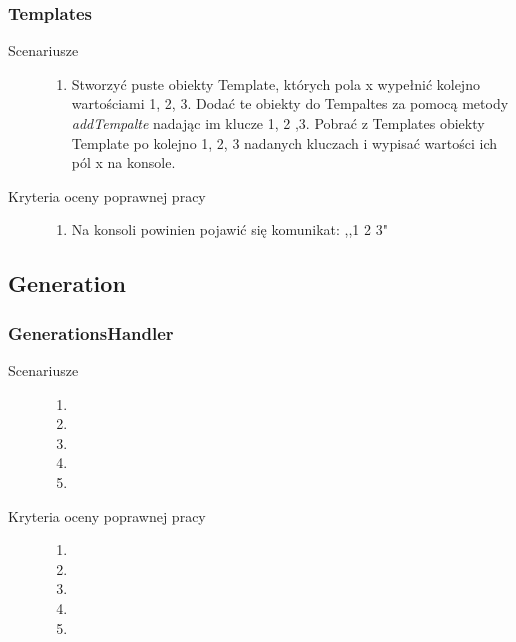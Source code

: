 \documentclass[a4paper,11pt]{article}
\begin{document}
\subsubsection{Templates}
\begin{description}

\item[Scenariusze] \hfill
\begin{enumerate}
\item Stworzyć puste obiekty Template, których pola x wypełnić kolejno wartościami 1, 2, 3. Dodać te obiekty do Tempaltes za pomocą metody \textit{addTempalte} nadając im  klucze 1, 2 ,3. Pobrać z Templates obiekty Template po kolejno 1, 2, 3 nadanych kluczach i wypisać wartości ich pól x na konsole.

\end{enumerate}

\item[Kryteria oceny poprawnej pracy] \hfill
\begin{enumerate}
\item  Na konsoli powinien pojawić się komunikat: ,,1 2 3"

\end{enumerate}

\end{description}

\subsection{Generation}
\subsubsection{GenerationsHandler}
\begin{description}

\item[Scenariusze] \hfill
\begin{enumerate}
\item
\item 
\item
\item
\item 
\end{enumerate}

\item[Kryteria oceny poprawnej pracy] \hfill
\begin{enumerate}
\item 
\item
\item
\item 
\item 
\end{enumerate}

\end{description}
\end{document}
